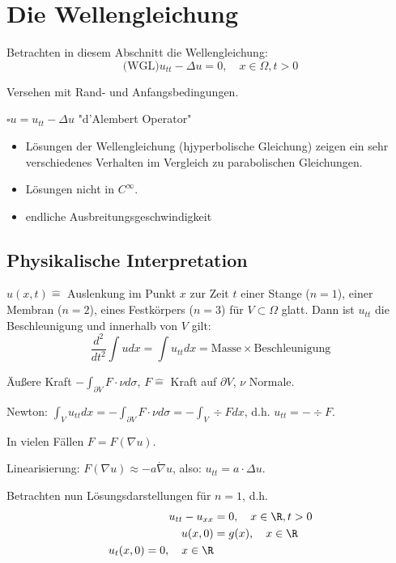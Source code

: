 \section{Die Wellengleichung}

Betrachten in diesem Abschnitt die Wellengleichung:
$$
\text{(WGL)} u_{tt} - \Delta u = 0, \quad x \in \Omega, t > 0
$$

Versehen mit Rand- und Anfangsbedingungen.

\begin{ntion}
  $\square u = u_{tt} - \Delta u$ "d'Alembert Operator"
\end{ntion}

\begin{itemize}
  \item Lösungen der Wellengleichung (hjyperbolische Gleichung) zeigen ein sehr verschiedenes Verhalten im Vergleich zu parabolischen Gleichungen.
  \item Lösungen nicht in $C^\infty$.
  \item endliche Ausbreitungsgeschwindigkeit
\end{itemize}

\subsection{Physikalische Interpretation}

$u(x,t)  \hat = $ Auslenkung im Punkt $x$ zur Zeit $t$ einer Stange ($n = 1$), einer Membran ($n = 2$), eines Festkörpers ($n = 3$) für $V \subset \Omega$ glatt.
Dann ist $u_{tt}$ die Beschleunigung und innerhalb von $V$ gilt: 
$$
\frac{d^2}{dt^2} \int u dx = \int u_{tt} dx = \text{Masse} \times \text{Beschleunigung}
$$

Äußere Kraft $-\int_{\partial V} F \cdot \nu d \sigma$, $F \hat =$ Kraft auf $\partial V$, $\nu$ Normale.

Newton: $\int_V u_{tt} dx = -\int_{\partial V} F \cdot \nu d\sigma = - \int_V \div F dx$, d.h. $u_{tt} = -\div F$.

In vielen Fällen $F = F(\nabla u)$.

Linearisierung: $F(\nabla u) \approx -a \dot \nabla u$, also: $u_{tt} = a \cdot \Delta u$.

Betrachten nun Lösungsdarstellungen für $n = 1$, d.h.
\begin{align*}
  u_{tt} - u_{xx} &= 0, \quad x \in \R, t > 0 \\
  u(x,0) &= g(x), \quad x \in \R \\
  u_t(x,0) = 0, \quad x \in \R
\end{align*}

